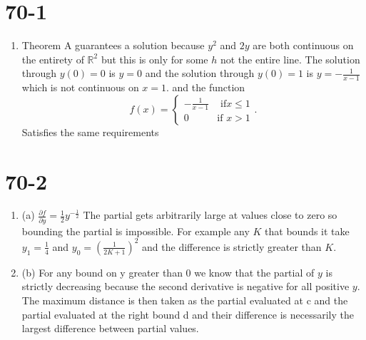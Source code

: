 \documentclass{article}
\begin{document}
    \section{70-1}
    \begin{enumerate}
        \item Theorem A guarantees a solution because $y^2$ and $2y$ are both continuous on the 
        entirety of $ \mathbb{R}^2$ but this is only for some $h$ not the entire line.
        The solution through $y(0) = 0$ is $y=0$ and the solution through $y(0) = 1$ is $y = -\frac{1}{x-1}$ which is not continuous on 
        $x = 1$. and the function
        \[
        f(x) = 
        \begin{cases}
            -\frac{1}{x-1} & \text{ if} x \le 1 \\
            0 & \text{if } x > 1
        \end{cases}
        .\] 
        Satisfies the same requirements
    \end{enumerate}
    \section{70-2}
    \begin{enumerate}
        \item (a) 
            $\frac{\partial f}{\partial y} = \frac{1}{2}y^{-\frac{1}{2}}$
            The partial gets arbitrarily large at values close to zero so bounding the partial is impossible.
            For example any $K$ that bounds it take $y_1 = \frac{1}{4}$ and $y_0 = (\frac{1}{2K+1})^2$ and the difference is strictly greater than $K$.
        \item (b)
            For any bound on y greater than $0$ we know that the partial of $y$ is strictly decreasing because the second derivative is negative for all positive $y$.
            The maximum distance is then taken as the partial evaluated at c and the partial evaluated at the right bound d and their difference is necessarily the largest
            difference between partial values.
    \end{enumerate}




    
\end{document}
